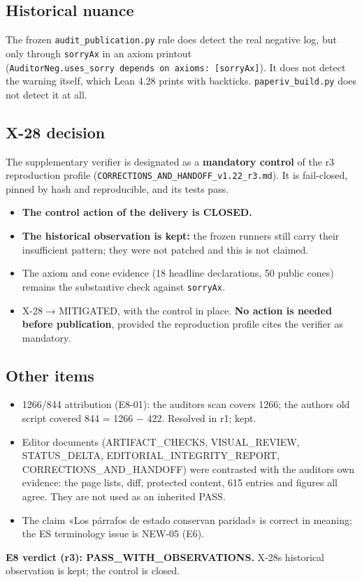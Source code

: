 \documentclass[
]{article}
\providecommand{\tightlist}{%
  \setlength{\itemsep}{0pt}\setlength{\parskip}{0pt}}
\begin{document}
\subsection{Historical nuance}\label{historical-nuance}

The frozen \texttt{audit\_publication.py} rule does detect the real
negative log, but only through \texttt{sorryAx} in an axiom printout
(\texttt{\textquotesingle{}AuditorNeg.uses\_sorry\textquotesingle{}\ depends\ on\ axioms:\ {[}sorryAx{]}}).
It does not detect the warning itself, which Lean 4.28 prints with
backticks. \texttt{paperiv\_build.py} does not detect it at all.

\subsection{X-28 decision}\label{x-28-decision}

The supplementary verifier is designated as a \textbf{mandatory control}
of the r3 reproduction profile
(\texttt{CORRECTIONS\_AND\_HANDOFF\_v1.22\_r3.md}). It is fail-closed,
pinned by hash and reproducible, and its tests pass.

\begin{itemize}
\tightlist
\item
  \textbf{The control action of the delivery is CLOSED.}
\item
  \textbf{The historical observation is kept:} the frozen runners still
  carry their insufficient pattern; they were not patched and this is
  not claimed.
\item
  The axiom and cone evidence (18 headline declarations, 50 public
  cones) remains the substantive check against \texttt{sorryAx}.
\item
  X-28 → MITIGATED, with the control in place. \textbf{No action is
  needed before publication}, provided the reproduction profile cites
  the verifier as mandatory.
\end{itemize}

\subsection{Other items}\label{other-items}

\begin{itemize}
\tightlist
\item
  1266/844 attribution (E8-01): the auditor\textquotesingle s scan
  covers 1266; the author\textquotesingle s old script covered 844 =
  1266 − 422. Resolved in r1; kept.
\item
  Editor documents (ARTIFACT\_CHECKS, VISUAL\_REVIEW, STATUS\_DELTA,
  EDITORIAL\_INTEGRITY\_REPORT, CORRECTIONS\_AND\_HANDOFF) were
  contrasted with the auditor\textquotesingle s own evidence: the page
  lists, diff, protected content, 615 entries and figures all agree.
  They are not used as an inherited PASS.
\item
  The claim «Los párrafos de estado conservan paridad» is correct in
  meaning; the ES terminology issue is NEW-05 (E6).
\end{itemize}

\textbf{E8 verdict (r3): PASS\_WITH\_OBSERVATIONS.}
X-28\textquotesingle s historical observation is kept; the control is
closed.
\end{document}
